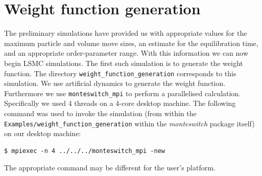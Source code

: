 \documentclass{report}
\begin{document}
\section{Weight function generation}\label{sec:example_generation}
The preliminary simulations have provided us with appropriate values for the maximum particle and volume move sizes, an estimate for
the equilibration time, and an appropriate order-parameter range. With this information we can
now begin LSMC simulations. The first such simulation is to generate the weight function. The directory
\texttt{weight\_function\_generation} corresponds to this simulation. We use artificial dynamics to generate the weight function. 
Furthermore we use \texttt{monteswitch\_mpi} to perform a parallelised calculation. Specifically we used 4 threads on a 4-core desktop machine. 
The following command was used to invoke the simulation (from within the \texttt{Examples/weight\_function\_generation} within the \emph{monteswitch} 
package itself) on our desktop machine:
\begin{verbatim}
$ mpiexec -n 4 ../../../monteswitch_mpi -new
\end{verbatim}
The appropriate command may be different for the user's platform.
\end{document}
